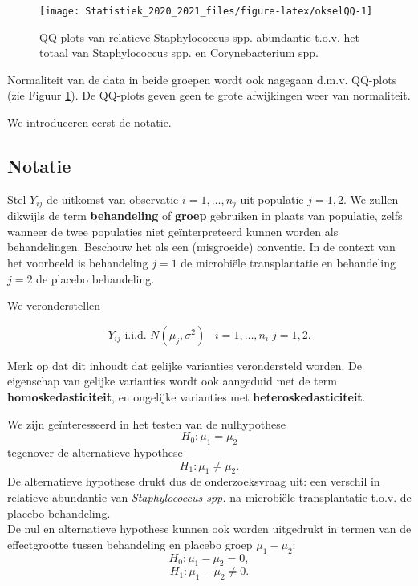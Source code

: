 \documentclass[
  12pt,dutch,coursenotes]{book}
\theoremstyle{definition}
\theoremstyle{definition}
\theoremstyle{definition}
\theoremstyle{remark}
\begin{document}
\begin{figure}

{\centering \texttt{[image: Statistiek\_2020\_2021\_files/figure-latex/okselQQ-1]} 

}

\caption{QQ-plots van relatieve Staphylococcus spp. abundantie t.o.v. het totaal van Staphylococcus spp. en Corynebacterium spp.}\label{fig:okselQQ}
\end{figure}

Normaliteit van de data in beide groepen wordt ook nagegaan d.m.v. QQ-plots (zie Figuur \ref{fig:okselQQ}). De QQ-plots geven geen te grote afwijkingen weer van normaliteit.

We introduceren eerst de notatie.

\hypertarget{notatie}{%
\subsection{Notatie}\label{notatie}}

Stel \(Y_{ij}\) de uitkomst van observatie \(i=1,\ldots, n_j\) uit populatie \(j=1,2\). We zullen dikwijls de term \textbf{behandeling} of \textbf{groep} gebruiken in plaats van populatie, zelfs wanneer de twee populaties niet geïnterpreteerd kunnen worden als behandelingen. Beschouw het als een (misgroeide) conventie. In de context van het voorbeeld is behandeling \(j=1\) de microbiële transplantatie en behandeling \(j=2\) de placebo behandeling.

We veronderstellen

\[Y_{ij}\text{ i.i.d. } N(\mu_j,\sigma^2)\;\;\;i=1,\ldots,n_i\;j=1,2.\]

Merk op dat dit inhoudt dat gelijke varianties verondersteld worden. De eigenschap van gelijke varianties wordt ook aangeduid met de term \textbf{homoskedasticiteit}, en ongelijke varianties met \textbf{heteroskedasticiteit}.

We zijn geïnteresseerd in het testen van de nulhypothese
\[ H_0: \mu_1 = \mu_2 \]
tegenover de alternatieve hypothese
\[  H_1: \mu_1 \neq \mu_2 .\]
De alternatieve hypothese drukt dus de onderzoeksvraag uit: een verschil in relatieve abundantie van \emph{Staphylococcus spp.} na microbiële transplantatie t.o.v. de placebo behandeling.\\
De nul en alternatieve hypothese kunnen ook worden uitgedrukt in termen van de effectgrootte tussen behandeling en placebo groep \(\mu_1-\mu_2\):
\[H_0: \mu_1-\mu_2 = 0,\]
\[H_1: \mu_1-\mu_2 \neq 0.\]
\end{document}
